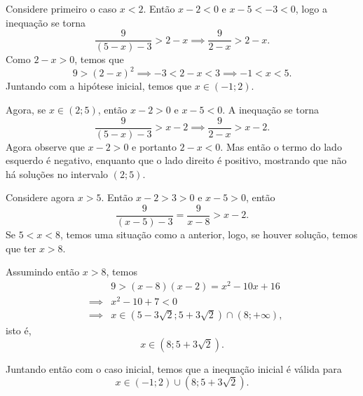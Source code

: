 Considere primeiro o caso $x<2$.
Então $x-2<0$ e $x-5<-3<0$, logo a inequação se torna
\[
	\frac{9}{(5-x)-3}>2-x\implies \frac{9}{2-x}>2-x.
\]
Como $2-x>0$, temos que
\[
	9>(2-x)^2\implies -3<2-x<3\implies -1<x<5.
\]
Juntando com a hipótese inicial, temos que $x\in(-1;2)$.

Agora, se $x\in(2;5)$, então $x-2>0$ e $x-5<0$.
A inequação se torna
\[
	\frac{9}{(5-x)-3}>x-2\implies \frac{9}{2-x}>x-2.
\]
Agora observe que $x-2>0$ e portanto $2-x<0$.
Mas então o termo do lado esquerdo é negativo, enquanto que o lado direito é positivo, mostrando que não há soluções
no intervalo $(2;5)$.

Considere agora $x>5$.
Então $x-2>3>0$ e $x-5>0$, então
\[
	\frac{9}{(x-5)-3}=\frac{9}{x-8}>x-2.
\]
Se $5<x<8$, temos uma situação como a anterior, logo, se houver solução, temos que ter $x>8$.

Assumindo então $x>8$, temos
\begin{eqnarray*}
	& & 9>(x-8)(x-2)=x^2-10x+16\\
	& \implies & x^2-10+7<0\\
	& \implies & x\in\left(5-3\sqrt{2};5+3\sqrt{2}\right)\cap(8;+\infty),
\end{eqnarray*}
isto é,
\[
	x\in(8;5+3\sqrt{2}).
\]

Juntando então com o caso inicial, temos que a inequação inicial é válida para
\[
	x\in(-1;2)\cup(8;5+3\sqrt{2}).
\]
